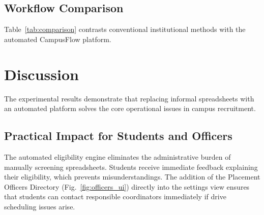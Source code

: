 \documentclass[conference]{IEEEtran}
\begin{document}
\subsection{Workflow Comparison}
Table~\ref{tab:comparison} contrasts conventional institutional methods with the automated CampusFlow platform.

\begin{table}[ht]
\caption{Workflow Comparison: Conventional vs. CampusFlow}
\label{tab:comparison}
\centering
{}
\end{table}

\section{Discussion}
The experimental results demonstrate that replacing informal spreadsheets with an automated platform solves the core operational issues in campus recruitment.

\subsection{Practical Impact for Students and Officers}
The automated eligibility engine eliminates the administrative burden of manually screening spreadsheets. Students receive immediate feedback explaining their eligibility, which prevents misunderstandings. The addition of the Placement Officers Directory (Fig.~\ref{fig:officers_ui}) directly into the settings view ensures that students can contact responsible coordinators immediately if drive scheduling issues arise.
\end{document}
